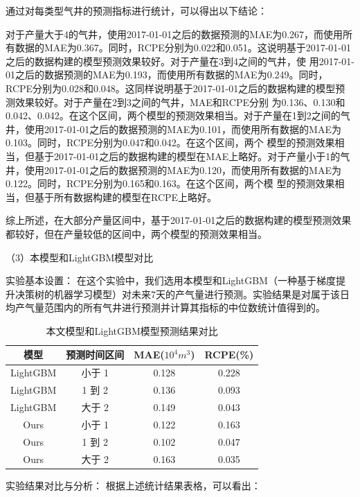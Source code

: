 通过对每类型气井的预测指标进行统计，可以得出以下结论：

对于产量大于4的气井，使用2017-01-01之后的数据预测的MAE为0.267，而使用所有数据的MAE为0.367。同时，RCPE分别为0.022和0.051。这说明基于2017-01-01之后的数据构建的模型预测效果较好。对于产量在3到4之间的气井，使
用2017-01-01之后的数据预测的MAE为0.193，而使用所有数据的MAE为0.249。同时，RCPE分别为0.028和0.048。这同样说明基于2017-01-01之后的数据构建的模型预测效果较好。对于产量在2到3之间的气井，MAE和RCPE分别
为0.136、0.130和0.042、0.042。在这个区间，两个模型的预测效果相当。对于产量在1到2之间的气井，使用2017-01-01之后的数据预测的MAE为0.101，而使用所有数据的MAE为0.103。同时，RCPE分别为0.047和0.042。在这个区间，两个
模型的预测效果相当，但基于2017-01-01之后的数据构建的模型在MAE上略好。对于产量小于1的气井，使用2017-01-01之后的数据预测的MAE为0.120，而使用所有数据的MAE为0.122。同时，RCPE分别为0.165和0.163。在这个区间，两个模
型的预测效果相当，但基于所有数据构建的模型在RCPE上略好。

综上所述，在大部分产量区间中，基于2017-01-01之后的数据构建的模型预测效果都较好，但在产量较低的区间中，两个模型的预测效果相当。

（3）本模型和LightGBM模型对比

实验基本设置： 在这个实验中，我们选用本模型和LightGBM（一种基于梯度提升决策树的机器学习模型）对未来7天的产气量进行预测。实验结果是对属于该日均产气量范围内的所有气井进行预测并计算其指标的中位数统计值得到的。
\begin{table}[H]
    \renewcommand{\arraystretch}{1.5}
    \centering
    \caption{本文模型和LightGBM模型预测结果对比}
    \label{tab:prediction_comparison}
    \begin{tabular}{|c|c|c|c|}
    \hline
    模型     & 预测时间区间 & MAE($10^4 m^3$) & RCPE(\%) \\ \hline
    LightGBM & 小于 1      & 0.128           & 0.228    \\ \hline
    LightGBM & 1 到 2      & 0.136           & 0.093    \\ \hline
    LightGBM & 大于 2      & 0.149           & 0.043    \\ \hline
    Ours      & 小于 1      & 0.122           & 0.163    \\ \hline
    Ours      & 1 到 2      & 0.102           & 0.047    \\ \hline
    Ours      & 大于 2      & 0.163           & 0.035    \\ \hline
    \end{tabular}
\end{table}
实验结果对比与分析： 根据上述统计结果表格，可以看出：

